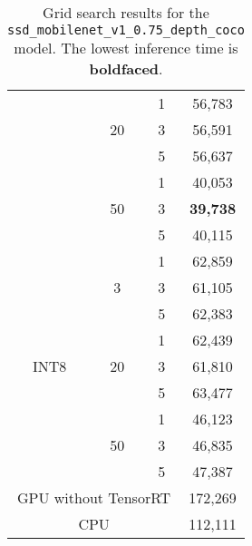 \begin{table}[]
\begin{tabular}{cccc}
		\multicolumn{1}{|c|}{}   & \multicolumn{1}{c|}{\multirow{3}{*}{20}} & \multicolumn{1}{c|}{1}  & \multicolumn{1}{c|}{56,783}    \\ \cline{3-4} 
		\multicolumn{1}{|c|}{}   & \multicolumn{1}{c|}{}          & \multicolumn{1}{c|}{3}  & \multicolumn{1}{c|}{56,591}    \\ \cline{3-4} 
		\multicolumn{1}{|c|}{}   & \multicolumn{1}{c|}{}          & \multicolumn{1}{c|}{5}  & \multicolumn{1}{c|}{56,637}    \\ \cline{2-4} 
		\multicolumn{1}{|c|}{}   & \multicolumn{1}{c|}{\multirow{3}{*}{50}} & \multicolumn{1}{c|}{1}  & \multicolumn{1}{c|}{40,053}    \\ \cline{3-4} 
		\multicolumn{1}{|c|}{}   & \multicolumn{1}{c|}{}          & \multicolumn{1}{c|}{3}  & \multicolumn{1}{c|}{\textbf{39,738}}    \\ \cline{3-4} 
		\multicolumn{1}{|c|}{}   & \multicolumn{1}{c|}{}          & \multicolumn{1}{c|}{5}  & \multicolumn{1}{c|}{40,115}    \\ \hline
		\multicolumn{1}{|c|}{\multirow{9}{*}{INT8}} & \multicolumn{1}{c|}{\multirow{3}{*}{3}}  & \multicolumn{1}{c|}{1}  & \multicolumn{1}{c|}{62,859}    \\ \cline{3-4} 
		\multicolumn{1}{|c|}{}   & \multicolumn{1}{c|}{}          & \multicolumn{1}{c|}{3}  & \multicolumn{1}{c|}{61,105}    \\ \cline{3-4} 
		\multicolumn{1}{|c|}{}   & \multicolumn{1}{c|}{}          & \multicolumn{1}{c|}{5}  & \multicolumn{1}{c|}{62,383}    \\ \cline{2-4} 
		\multicolumn{1}{|c|}{}   & \multicolumn{1}{c|}{\multirow{3}{*}{20}} & \multicolumn{1}{c|}{1}  & \multicolumn{1}{c|}{62,439}    \\ \cline{3-4} 
		\multicolumn{1}{|c|}{}   & \multicolumn{1}{c|}{}          & \multicolumn{1}{c|}{3}  & \multicolumn{1}{c|}{61,810}    \\ \cline{3-4} 
		\multicolumn{1}{|c|}{}   & \multicolumn{1}{c|}{}          & \multicolumn{1}{c|}{5}  & \multicolumn{1}{c|}{63,477}    \\ \cline{2-4} 
		\multicolumn{1}{|c|}{}   & \multicolumn{1}{c|}{\multirow{3}{*}{50}} & \multicolumn{1}{c|}{1}  & \multicolumn{1}{c|}{46,123}    \\ \cline{3-4} 
		\multicolumn{1}{|c|}{}   & \multicolumn{1}{c|}{}          & \multicolumn{1}{c|}{3}  & \multicolumn{1}{c|}{46,835}    \\ \cline{3-4} 
		\multicolumn{1}{|c|}{}   & \multicolumn{1}{c|}{}          & \multicolumn{1}{c|}{5}  & \multicolumn{1}{c|}{47,387}    \\ \hline
		\multicolumn{3}{|c|}{GPU without TensorRT}       & \multicolumn{1}{c|}{172,269}   \\ \hline
		\multicolumn{3}{|c|}{CPU}        & \multicolumn{1}{c|}{112,111}   \\ \hline
	\end{tabular}
	\caption{Grid search results for the \texttt{ssd\_mobilenet\_v1\_0.75\_depth\_coco} model. The lowest inference time is \textbf{boldfaced}.}
	\label{tab:3_ssd_trt_results}
\end{table}



